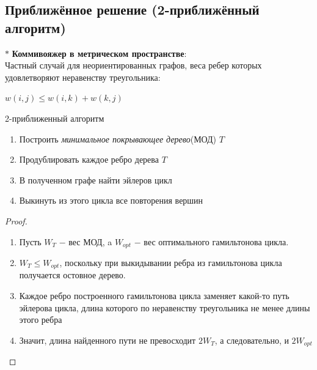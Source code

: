         
    \subsection{Приближённое решение (2-приближённый алгоритм)}

        $\ast$ \textbf{Коммивояжер в метрическом пространстве}:\\
        Частный случай для неориентированных графов, веса ребер которых удовлетворяют неравенству треугольника:
        \begin{center}
            $w(i,j) \leq w(i,k) + w(k,j)$
        \end{center}

        \begin{algorithm}
            \caption{2-приближенный алгоритм}
            \begin{algorithmic}
                \begin{enumerate}
                    \item Построить \textit{минимальное покрывающее дерево}(МОД) $T$
                    \item Продублировать каждое ребро дерева $T$
                    \item В полученном графе найти эйлеров цикл
                    \item Выкинуть из этого цикла все повторения вершин
                \end{enumerate}
            \end{algorithmic}
        \end{algorithm}

        \begin{proof}
         \begin{enumerate}
             \item Пусть $W_T$ $-$ вес МОД,  a $W_{opt}$ $-$ вес оптимального гамильтонова цикла.
             \item $W_T \leq W_{opt}$, поскольку при выкидывании ребра из гамильтонова цикла получается остовное дерево.
             \item Каждое ребро построенного гамильтонова цикла заменяет какой-то путь эйлерова цикла, длина которого по неравенству треугольника не менее длины этого ребра
             \item Значит, длина найденного пути не превосходит $2W_T$, а следовательно, и $2W_{opt}$
        \end{enumerate}   
        \end{proof}
            
